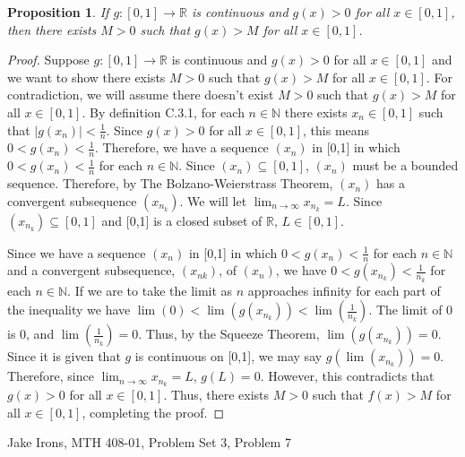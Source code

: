 \documentclass[11 pt]{article}
\newtheorem{proposition}{Proposition}
\newcommand{\newpar}{\vspace{.15in}\noindent}
\begin{document}
\newpar
\begin{proposition}
If $g:[0, 1]\rightarrow\mathbb{R}$ is continuous and $g(x)>0$ for all $x\in[0, 1]$, then there exists
$M>0$ such that $g(x)>M$ for all $x\in[0, 1]$.
\end{proposition}
\begin{proof}
Suppose $g:[0, 1]\rightarrow\mathbb{R}$ is continuous and $g(x)>0$ for all $x\in[0, 1]$ and we want to show there exists $M>0$ such that $g(x)>M$ for all $x\in[0, 1]$. For contradiction, we will assume there doesn't exist $M>0$ such that $g(x)>M$ for all $x\in[0,1]$. By definition C.3.1, for each $n\in\mathbb{N}$ there exists $x_n\in[0,1]$ such that $\mid g(x_n)\mid<\frac{1}{n}$. Since $g(x)>0$ for all $x\in[0,1]$, this means $0<g(x_n)<\frac{1}{n}$. Therefore, we have a sequence $(x_n)$ in [0,1] in which $0<g(x_n)<\frac{1}{n}$ for each $n\in\mathbb{N}$. Since $(x_n)\subseteq[0,1]$, $(x_n)$ must be a bounded sequence. Therefore, by The Bolzano-Weierstrass Theorem, $(x_n)$ has a convergent subsequence $(x_n_k)$. We will let $\displaystyle{\lim_{n \to \infty}}x_n_k=L$. Since $(x_n_k)\subseteq[0,1]$ and [0,1] is a closed subset of $\mathbb{R}$, $L\in[0,1]$.

\newpar
Since we have a sequence $(x_n)$ in [0,1] in which $0<g(x_n)<\frac{1}{n}$ for each $n\in\mathbb{N}$ and a convergent subsequence, $(x_{nk})$, of $(x_n)$, we have $0<g(x_n_k)<\frac{1}{n_k}$ for each $n\in\mathbb{N}$. If we are to take the limit as $n$ approaches infinity for each part of the inequality we have $\lim(0)<\lim(g(x_n_k))<\lim(\frac{1}{n_k})$. The limit of 0 is 0, and $\lim(\frac{1}{n_k})=0$. Thus, by the Squeeze Theorem, $\lim(g(x_n_k))=0$. Since it is given that $g$ is continuous on [0,1], we may say $g(\lim(x_n_k))=0$. Therefore, since $\displaystyle{\lim_{n \to \infty}}x_n_k=L$, $g(L)=0$. However, this contradicts that $g(x)>0$ for all $x\in[0,1]$. Thus, there exists $M>0$ such that $f(x)>M$ for all $x\in[0,1]$, completing the proof.



\end{proof}
\newpage
\noindent Jake Irons, MTH 408-01, Problem Set 3, Problem 7
\end{document}
